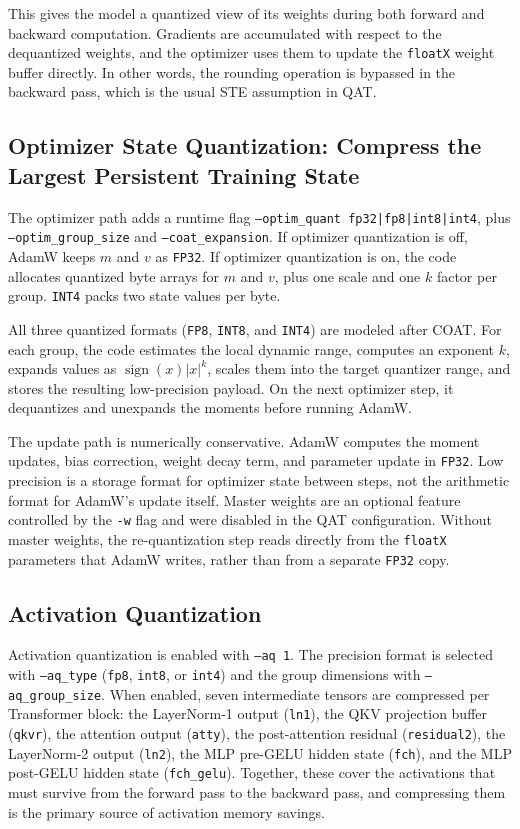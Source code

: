 \documentclass{article}
\begin{document}
This gives the model a quantized view of its weights during both forward and backward
computation. Gradients are accumulated with respect to the dequantized weights, and the
optimizer uses them to update the \texttt{floatX} weight buffer directly. In other words,
the rounding operation is bypassed in the backward pass, which is the usual STE assumption
in QAT.

\subsection{Optimizer State Quantization: Compress the Largest Persistent Training State}

The optimizer path adds a runtime flag \texttt{--optim\_quant fp32|fp8|int8|int4}, plus
\texttt{--optim\_group\_size} and \texttt{--coat\_expansion}. If optimizer quantization is
off, AdamW keeps $m$ and $v$ as \texttt{FP32}. If optimizer quantization is on, the code
allocates quantized byte arrays for $m$ and $v$, plus one scale and one $k$ factor per
group. \texttt{INT4} packs two state values per byte.

All three quantized formats (\texttt{FP8}, \texttt{INT8}, and \texttt{INT4}) are modeled
after COAT. For each group, the code estimates the local dynamic range, computes an exponent
$k$, expands values as $\operatorname{sign}(x)|x|^k$, scales them into the target quantizer
range, and stores the resulting low-precision payload. On the next optimizer step, it
dequantizes and unexpands the moments before running AdamW.

The update path is numerically conservative. AdamW computes the moment updates, bias
correction, weight decay term, and parameter update in \texttt{FP32}. Low precision is a
storage format for optimizer state between steps, not the arithmetic format for AdamW's
update itself. Master weights are an optional feature controlled by the \texttt{-w} flag
and were disabled in the QAT configuration. Without master weights, the re-quantization
step reads directly from the \texttt{floatX} parameters that AdamW writes, rather than
from a separate \texttt{FP32} copy.

\subsection{Activation Quantization}

Activation quantization is enabled with \texttt{--aq 1}. The precision format is selected
with \texttt{--aq\_type} (\texttt{fp8}, \texttt{int8}, or \texttt{int4}) and the group
dimensions with \texttt{--aq\_group\_size}. When enabled, seven intermediate tensors are
compressed per Transformer block: the LayerNorm-1 output (\texttt{ln1}), the QKV projection
buffer (\texttt{qkvr}), the attention output (\texttt{atty}), the post-attention residual
(\texttt{residual2}), the LayerNorm-2 output (\texttt{ln2}), the MLP pre-GELU hidden state
(\texttt{fch}), and the MLP post-GELU hidden state (\texttt{fch\_gelu}). Together, these
cover the activations that must survive from the forward pass to the backward pass, and
compressing them is the primary source of activation memory savings.
\end{document}
